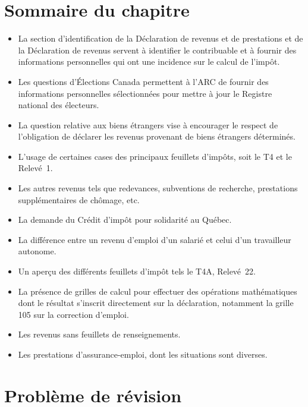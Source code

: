 \section{Sommaire du chapitre}
\begin{itemize}[label=]
	\item La section d'identification de la Déclaration de revenus et de prestations et de la Déclaration de revenus servent à identifier le contribuable et à fournir des informations personnelles qui ont une incidence sur le calcul de l'impôt.
	\item Les questions d'Élections Canada permettent à l'ARC de fournir des informations personnelles sélectionnées pour mettre à jour le Registre national des électeurs.
	\item La question relative aux biens étrangers vise à encourager le respect de l'obligation de déclarer les revenus provenant de biens étrangers déterminés.
	\item L'usage de certaines cases des principaux feuillets d'impôts, soit le T4 et le Relevé~1.
	\item Les autres revenus tels que redevances, subventions de recherche, prestations supplémentaires de chômage, etc.
	\item La demande du Crédit d'impôt pour solidarité au Québec.
	\item La différence entre un revenu d'emploi d'un salarié et celui d'un travailleur autonome.
	\item Un aperçu des différents feuillets d'impôt tels le T4A, Relevé~22.
	\item La présence de grilles de calcul pour effectuer des opérations mathématiques dont le résultat s'inscrit directement sur la déclaration, notamment la grille 105 sur la correction d'emploi.
	\item Les revenus sans feuillets de renseignements. 
	\item Les prestations d'assurance-emploi, dont les situations sont diverses.
\end{itemize}



\section{Problème de révision}
